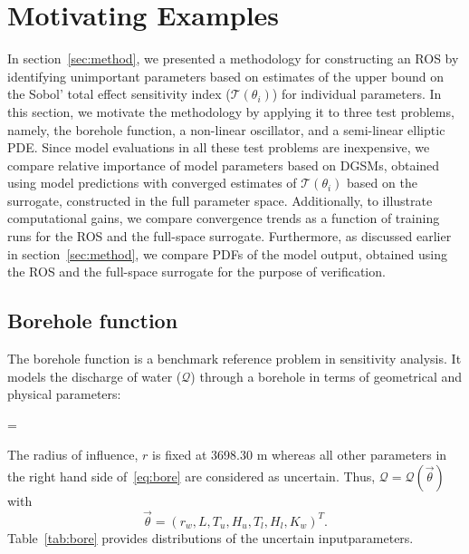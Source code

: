 \section{Motivating Examples}
\label{sec:examples}

In section~\ref{sec:method}, we presented a methodology for constructing
an ROS by identifying unimportant parameters based on 
estimates of the upper bound on the Sobol'
total effect sensitivity index ($\mathcal{T}(\theta_i)$) for individual parameters.
In this section, we motivate the methodology by applying it to three test problems,
namely, the borehole function, a non-linear oscillator, and a semi-linear elliptic PDE.
Since model evaluations in all these test
problems are inexpensive, we compare relative importance of model parameters based
on DGSMs, obtained using model predictions with 
converged estimates of $\mathcal{T}(\theta_i)$ based on the surrogate, constructed in the
full parameter space. Additionally, to illustrate computational gains, we compare
convergence trends as a function of training runs for the ROS and the full-space
surrogate. Furthermore, as discussed earlier in section~\ref{sec:method}, we compare
PDFs of the model output, obtained using the ROS and the full-space surrogate for
the purpose of verification. 

\subsection{Borehole function}

The borehole function is a benchmark reference problem in sensitivity analysis. It models the discharge
of water ($\mathcal{Q}$) through a borehole in terms of geometrical and physical parameters:

\be
{} = 
\label{eq:bore}
\ee

\noindent The radius of influence, $r$ is fixed at 3698.30 m whereas all other parameters
in the right hand side of~\eqref{eq:bore} are considered 
as uncertain. Thus, $\mathcal{Q} = \mathcal{Q}(\vec{\theta})$ with 
\[
   \vec{\theta} = (r_w, L, T_u, H_u, T_l, H_l, K_w)^T.
\] 
Table~\ref{tab:bore} provides distributions of the uncertain inputparameters. 


